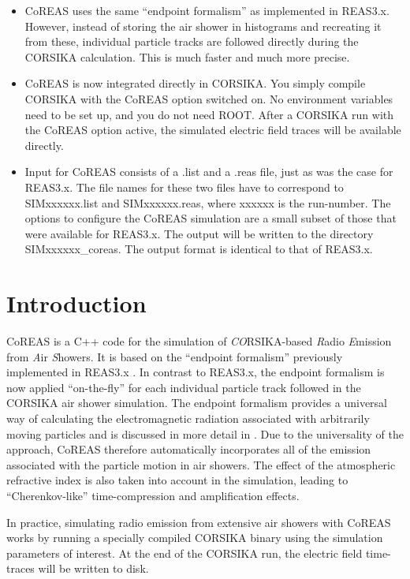 \documentclass[a4paper,10pt]{article}
\begin{document}
\begin{itemize}
\item{CoREAS uses the same ``endpoint formalism'' as implemented in REAS3.x. However, instead of storing the air shower in histograms and recreating it from these, individual particle tracks are followed directly during the CORSIKA calculation. This is much faster and much more precise.}
\item{CoREAS is now integrated directly in CORSIKA. You simply compile CORSIKA with the CoREAS option switched on. No environment variables need to be set up, and you do not need ROOT. After a CORSIKA run with the CoREAS option active, the simulated electric field traces will be available directly.}
\item{Input for CoREAS consists of a .list and a .reas file, just as was the case for REAS3.x. The file names for these two files have to correspond to SIMxxxxxx.list and SIMxxxxxx.reas, where xxxxxx is the run-number. The options to configure the CoREAS simulation are a small subset of those that were available for REAS3.x. The output will be written to the directory SIMxxxxxx\_coreas. The output format is identical to that of REAS3.x.}
\end{itemize}

\clearpage

\section{Introduction}

CoREAS \citep{HuegeLudwigJames2013} is a C++ code for the simulation of {\em CO}RSIKA-based {\em R}adio {\em E}mission from {\em A}ir {\em S}howers. It is based on the ``endpoint formalism'' previously implemented in REAS3.x \citep{LudwigHuege2010}. In contrast to REAS3.x, the endpoint formalism is now applied ``on-the-fly'' for each individual particle track followed in the CORSIKA air shower simulation. The endpoint formalism provides a universal way of calculating the electromagnetic radiation associated with arbitrarily moving particles and is discussed in more detail in \citep{JamesFalckeHuege2010}. Due to the universality of the approach, CoREAS therefore automatically incorporates all of the emission associated with the particle motion in air showers. The effect of the atmospheric refractive index is also taken into account in the simulation, leading to ``Cherenkov-like'' time-compression and amplification effects.

In practice, simulating radio emission from extensive air showers with CoREAS works by running a specially compiled CORSIKA binary using the simulation parameters of interest. At the end of the CORSIKA run, the electric field time-traces will be written to disk.
\end{document}
